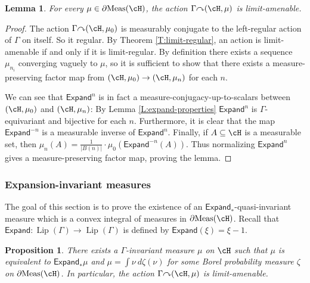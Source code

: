 \documentclass[12pt]{article}
\theoremstyle{plain}
\newtheorem{prop}[thm]{Proposition}
\newtheorem{lem}[thm]{Lemma}
\theoremstyle{definition}
\theoremstyle{remark}
\newcommand{\G}{\Gamma}
\newcommand{\Add}{\mathsf{Expand}}
\newcommand\Expand{{\mathsf{Expand}}}
\newcommand\Lip{\operatorname{Lip}}
\newcommand\Meas{{\operatorname{Meas}}}
\def\cc{{\curvearrowright}}
\begin{document}



\begin{lem}\label{L:metric-amenable}
    For every $\mu \in \partial\Meas(\cH)$, the action $\G \cc (\cH,\mu)$ is limit-amenable.
\end{lem}

\begin{proof}
The action $\G \cc (\cH,\mu_0)$ is measurably conjugate to the left-regular action of $\G$ on itself. So it regular. By Theorem
\ref{T:limit-regular}, an action is limit-amenable if and only if it is limit-regular.
By definition there exists a sequence $\mu_{n_i}$ converging vaguely to $\mu$, so it is sufficient to show that there exists a measure-preserving factor map from $(\cH, \mu_0) \to (\cH, \mu_n)$ for each $n$.

We can see that $\Expand^n$ is in fact a measure-conjugacy-up-to-scalars between $(\cH, \mu_0)$ and $(\cH, \mu_n)$: By Lemma \ref{L:expand-properties} $\Expand^n$ is $\G$-equivariant and bijective for each $n$. Furthermore, it is clear that the map $\Expand^{-n}$ is a measurable inverse of $\Expand^n$. Finally, if $A \subseteq \cH$ is a measurable set, then $\mu_n(A) = \frac{1}{|B(n)|}\cdot \mu_0(\Expand^{-n}(A))$. Thus normalizing $\Expand^n$ gives a measure-preserving factor map, proving the lemma.
\end{proof}



\subsubsection{Expansion-invariant measures}

The goal of this section is to prove the existence of an $\Add_*$-quasi-invariant measure which is a convex integral of measures in $\partial\Meas(\cH)$. Recall that $\Add:\Lip(\G)\to \Lip(\G)$ is defined by $\Add(\xi)=\xi-1$.


\begin{prop}\label{P:regular}
There exists a $\G$-invariant measure $\mu$ on $\cH$ such that $\mu$ is equivalent to $\Expand_{*}\mu$ and $\mu = \int \nu~d\zeta(\nu)$ for some Borel probability measure $\zeta$ on $\partial\Meas(\cH)$. In particular, the action $\G \cc (\cH,\mu)$ is limit-amenable.
\end{prop}
\end{document}
